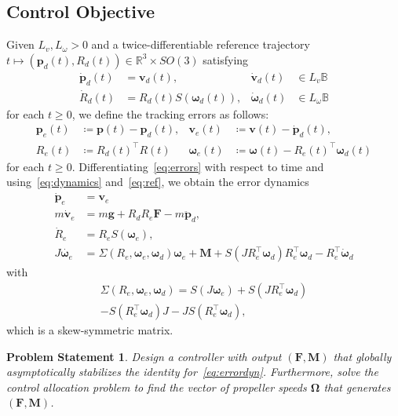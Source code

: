\documentclass[journal]{IEEEtran}
\newtheorem*{problem}{Problem Statement}
\newcommand{\tp}{^\top}
\newcommand{\ball}{\mathbb{B}}
\begin{document}
\subsection{Control Objective}
Given $L_v,L_\omega>0$ and a twice-differentiable reference trajectory $t\mapsto(\bm{p}_d(t),R_d(t))\in\mathbb{R}^3\times SO(3)$ satisfying
\begin{equation}\label{eq:ref}
\begin{aligned}
  \dot{\bm{p}}_d(t) &= \bm{v}_d(t), &
  \dot{\bm{v}}_d(t) &\in L_v\ball\\
  \dot{R}_d(t) &= R_d(t)S(\bm{\omega}_d(t)),& 
  \dot{\bm{\omega}}_d(t) &\in L_\omega\ball
\end{aligned}
\end{equation}
for each $t\geq 0$, we define the tracking errors as follows:
\begin{equation}\label{eq:errors}
\begin{aligned}
\bm{p}_e(t)&\coloneqq\bm{p}(t)-\bm{p}_d(t),&
\bm{v}_e(t)&\coloneqq\bm{v}(t)-\dot{\bm{p}}_d(t),\\
R_e(t)&\coloneqq R_d(t)^\top R(t)&
\bm{\omega}_e(t) &\coloneqq \bm{\omega}(t)-R_e(t)\tp\bm{\omega}_d(t)
\end{aligned}
\end{equation}
for each $t\geq 0$. 
Differentiating~\eqref{eq:errors} with respect to time and using~\eqref{eq:dynamics} and~\eqref{eq:ref}, we obtain the error dynamics
\begin{equation}\label{eq:errordyn}
\begin{aligned}
\dot{\bm{p}}_e &= \bm{v}_e\\
m\dot{\bm{v}}_e &= m\bm{g} + R_d R_e \bm{F} - m\ddot{\bm{p}}_d,\\
\dot{R}_e &= R_e S(\bm{\omega}_e),\\
J\dot{\bm{\omega}_e} &= \Sigma(R_e,\bm{\omega}_e,\bm{\omega}_d)\bm{\omega}_e+\bm{M} + S(JR_e\tp\bm{\omega}_d)R_e\tp\bm{\omega}_d - R_e\tp\dot{\bm{\omega}}_d
\end{aligned}
\end{equation}
with
\begin{multline*}
\Sigma(R_e,\bm{\omega}_e,\bm{\omega}_d) = S(J\bm{\omega}_e)+S(JR_e\tp\bm{\omega}_d)\\
-S(R_e\tp\bm{\omega}_d)J-J S(R_e\tp\bm{\omega}_d),
\end{multline*}
which is a skew-symmetric matrix. 

\begin{problem}
  Design a controller with output $(\bm{F},\bm{M})$ that globally asymptotically stabilizes the identity for~\eqref{eq:errordyn}. Furthermore, solve the control allocation problem to find the vector of propeller speeds $\bm{\Omega}$ that generates $(\bm{F},\bm{M})$.
\end{problem}
\end{document}
